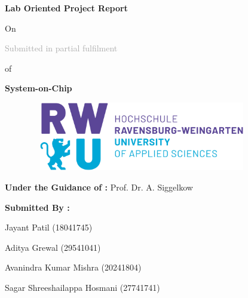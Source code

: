 \documentclass{report}
\begin{document}
\begin{titlepage}
\begin{center}
    \hspace{5mm}\textbf{\LARGE Lab Oriented Project Report }
    \begin{center}
    \vspace{0.5mm}
    \Large On
    \end{center}
    \vspace{0.5mm}
\end{center}

\vspace{10mm}
\begin{center}
\textcolor{darkgray}{\LARGE Submitted in partial fulfilment }
\end{center}
\begin{center}
\vspace{0.5mm}
\Large of
\vspace{0.5mm}
\end{center}
\begin{center}
\textbf{\LARGE System-on-Chip}
\end{center}

\vspace{10mm}

\begin{figure}[h!]
    \begin{center}
    \includegraphics[width=10cm, height=3cm]{Image/RWU.png}
    \end{center}
    \end{figure}
    
\vspace{3mm} 
\begin{center}
\textbf{\Large Under the Guidance of :}
\newline
\Large Prof. Dr. A. Siggelkow 
\end{center}

\vspace{10mm}

\textbf{\hspace{70mm} \Large Submitted By :}

\hspace{63mm} \Large Jayant Patil (18041745)
\par
\hspace{60mm} \Large Aditya Grewal (29541041)
\par
\hspace{57mm} \Large Avanindra Kumar Mishra (20241804) 
\par 
\hspace{47mm} \Large Sagar Shreeshailappa Hosmani (27741741)


\end{titlepage}
\end{document}
